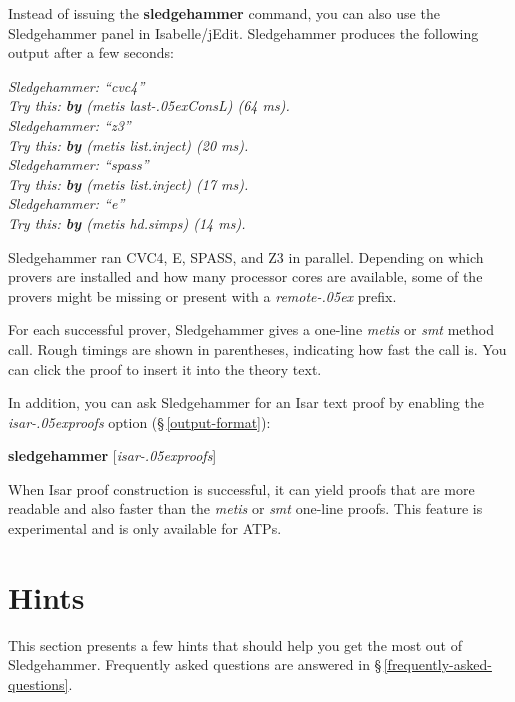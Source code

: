 \documentclass[a4paper,12pt]{article}
\let\oldS=\S
\def\S{\oldS\,}
\renewcommand\_{\hbox{\textunderscore\kern-.05ex}}
\begin{document}
Instead of issuing the \textbf{sledgehammer} command, you can also use the
Sledgehammer panel in Isabelle/jEdit. Sledgehammer produces the following output
after a few seconds:

\prew
\slshape
Sledgehammer: ``\textit{cvc4\/}'' \\
Try this: \textbf{by} (\textit{metis last\_ConsL}) (64 ms). \\[3\smallskipamount]
%
Sledgehammer: ``\textit{z3\/}'' \\
Try this: \textbf{by} (\textit{metis list.inject}) (20 ms). \\[3\smallskipamount]
%
Sledgehammer: ``\textit{spass\/}'' \\
Try this: \textbf{by} (\textit{metis list.inject}) (17 ms). \\[3\smallskipamount]
%
Sledgehammer: ``\textit{e\/}'' \\
Try this: \textbf{by} (\textit{metis hd.simps}) (14 ms). \\[3\smallskipamount]
\postw

Sledgehammer ran CVC4, E, SPASS, and Z3 in parallel. Depending on which
provers are installed and how many processor cores are available, some of the
provers might be missing or present with a \textit{remote\_} prefix.

For each successful prover, Sledgehammer gives a one-line \textit{metis} or
\textit{smt} method call. Rough timings are shown in parentheses, indicating how
fast the call is. You can click the proof to insert it into the theory text.

In addition, you can ask Sledgehammer for an Isar text proof by enabling the
\textit{isar\_proofs} option (\S\ref{output-format}):

\prew
\textbf{sledgehammer} [\textit{isar\_proofs}]
\postw

When Isar proof construction is successful, it can yield proofs that are more
readable and also faster than the \textit{metis} or \textit{smt} one-line
proofs. This feature is experimental and is only available for ATPs.

\section{Hints}
\label{hints}

This section presents a few hints that should help you get the most out of
Sledgehammer. Frequently asked questions are answered in
\S\ref{frequently-asked-questions}.

\newcommand\point[1]{\subsection{\emph{#1}}}
\end{document}
